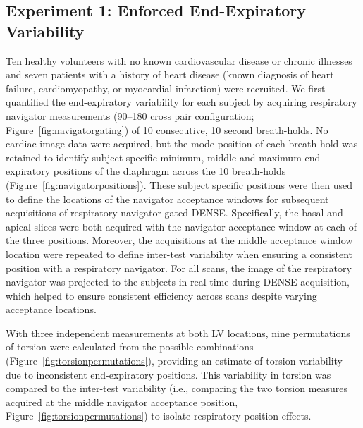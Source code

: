 \subsection{Experiment 1: Enforced End-Expiratory Variability}
	Ten healthy volunteers with no known cardiovascular disease or chronic illnesses and seven patients with a history of heart disease (known diagnosis of heart failure, cardiomyopathy, or myocardial infarction) were recruited. We first quantified the end-expiratory variability for each subject by acquiring respiratory navigator measurements (90–180 cross pair configuration; Figure~\ref{fig:navigatorgating}) of 10 consecutive, 10 second breath-holds. No cardiac image data were acquired, but the mode position of each breath-hold was retained to identify subject specific minimum, middle and maximum end-expiratory positions of the diaphragm across the 10 breath-holds (Figure~\ref{fig:navigatorpositions}). These subject specific positions were then used to define the locations of the navigator acceptance windows for subsequent acquisitions of respiratory navigator-gated DENSE. Specifically, the basal and apical slices were both acquired with the navigator acceptance window at each of the three positions. Moreover, the acquisitions at the middle acceptance window location were repeated to define inter-test variability when ensuring a consistent position with a respiratory navigator. For all scans, the image of the respiratory navigator was projected to the subjects in real time during DENSE acquisition, which helped to ensure consistent efficiency \cite{Hamlet2016} across scans despite varying acceptance locations.
	
	With three independent measurements at both LV locations, nine permutations of torsion were calculated from the possible combinations (Figure~\ref{fig:torsionpermutations}), providing an estimate of torsion variability due to inconsistent end-expiratory positions. This variability in torsion was compared to the inter-test variability (i.e., comparing the two torsion measures acquired at the middle navigator acceptance position, Figure~\ref{fig:torsionpermutations}) to isolate respiratory position effects.

